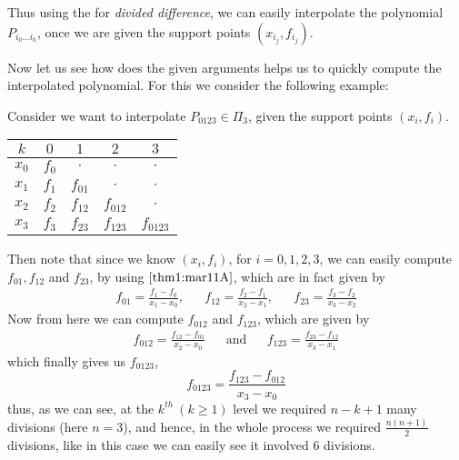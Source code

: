 Thus using the  for \textit{divided difference}, we can easily interpolate the polynomial $P_{i_0\dots i_k}$, once we are given the support points $(x_{i_j}, f_{i_j})$. 

Now let us see how does the given arguments helps us to quickly compute the interpolated polynomial. For this we consider the following example:

\begin{example}\label{eg1:mar11A}
    Consider we want to interpolate $P_{0123} \in \Pi_3$, given the support points $(x_i,f_i)$.

    \begin{center}
        \begin{tabular}{c|cccc}
            $k$ & $0$ & $1$ & $2$ & $3$ \\
            \hline 
            $ x_0 $ & $f_0$ & $ \cdot $ & $ \cdot $ & $ \cdot $ \\
            $ x_1 $ & $f_1$ & $f_{01}$ & $ \cdot $ & $ \cdot $ \\
            $ x_2 $ & $f_2$ & $f_{12}$ & $f_{012}$ & $ \cdot $ \\
            $ x_3 $ & $f_3$ & $f_{23}$ & $f_{123}$ & $f_{0123}$ 
        \end{tabular}
    \end{center}

    Then note that since we know $(x_i,f_i)$, for $i=0,1,2,3$, we can easily compute $f_{01}, f_{12}$ and $f_{23}$, by using  $\ref{thm1:mar11A}$, which are in fact given by 
    \begin{align*}
        f_{01} = \frac{f_1 - f_0}{x_1 - x_0}, &&f_{12} = \frac{f_2 - f_1}{x_2 - x_1}, &&f_{23} = \frac{f_3 - f_2}{x_3 - x_2}
    \end{align*}
    Now from here we can compute $f_{012}$ and $f_{123}$, which are given by 
    \begin{align*}
        f_{012} = \frac{f_{12} - f_{01}}{x_2 - x_0} &&\mbox{and} &&f_{123} = \frac{f_{23} - f_{12}}{x_3 - x_1}
    \end{align*}
    which finally gives us $f_{0123}$, 
    \[
        f_{0123} = \frac{f_{123} - f_{012}}{x_3 - x_0}    
    \]
    thus, as we can see, at the $k^{th} \ (k \geq 1)$ level we required $n - k + 1$ many divisions (here $n=3$), and hence, in the whole process we required $\frac{n(n+1)}{2}$ divisions, like in this case we can easily see it involved $6$ divisions.
\end{example}